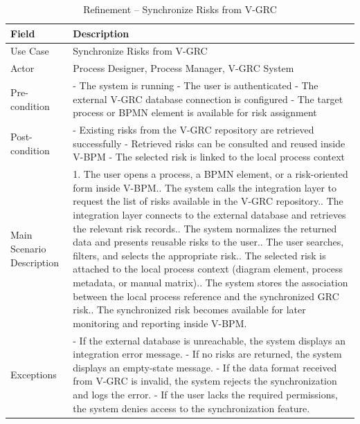 \begin{table}[H]
\centering
\caption{Refinement -- Synchronize Risks from V-GRC}
\label{tab:refinement-grc-fetch}
\begin{tabular}{|p{3cm}|p{12cm}|}
\hline
\textbf{Field} & \textbf{Description} \\
\hline
Use Case & Synchronize Risks from V-GRC \\
\hline
Actor & Process Designer, Process Manager, V-GRC System \\
\hline
Pre-condition &
- The system is running\newline
- The user is authenticated\newline
- The external V-GRC database connection is configured\newline
- The target process or BPMN element is available for risk assignment \\
\hline
Post-condition &
- Existing risks from the V-GRC repository are retrieved successfully\newline
- Retrieved risks can be consulted and reused inside V-BPM\newline
- The selected risk is linked to the local process context \\
\hline
Main Scenario Description &
1. The user opens a process, a BPMN element, or a risk-oriented form inside V-BPM.\newline
2. The system calls the integration layer to request the list of risks available in the V-GRC repository.\newline
3. The integration layer connects to the external database and retrieves the relevant risk records.\newline
4. The system normalizes the returned data and presents reusable risks to the user.\newline
5. The user searches, filters, and selects the appropriate risk.\newline
6. The selected risk is attached to the local process context (diagram element, process metadata, or manual matrix).\newline
7. The system stores the association between the local process reference and the synchronized GRC risk.\newline
8. The synchronized risk becomes available for later monitoring and reporting inside V-BPM. \\
\hline
Exceptions &
- If the external database is unreachable, the system displays an integration error message.\newline
- If no risks are returned, the system displays an empty-state message.\newline
- If the data format received from V-GRC is invalid, the system rejects the synchronization and logs the error.\newline
- If the user lacks the required permissions, the system denies access to the synchronization feature. \\
\hline
\end{tabular}
\end{table}

